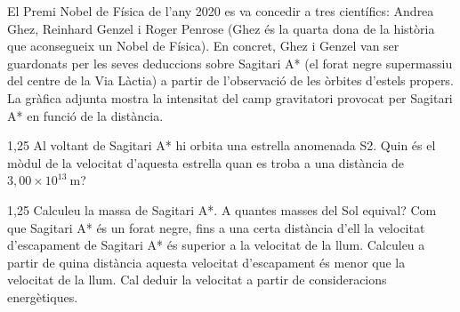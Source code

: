 El Premi Nobel de Física de l'any 2020 es va concedir a tres científics: Andrea Ghez, Reinhard Genzel i Roger Penrose (Ghez és la quarta dona de la història que aconsegueix un Nobel de Física). En concret, Ghez i Genzel van ser guardonats per les seves deduccions sobre Sagitari A* (el forat negre supermassiu del centre de la Via Làctia) a partir de l'observació de les òrbites d'estels propers. La gràfica adjunta mostra la intensitat del camp gravitatori provocat per Sagitari A* en funció de la distància.


\begin{apartat}{1,25}
Al voltant de Sagitari A* hi orbita una estrella anomenada S2. Quin és el mòdul de la velocitat d'aquesta estrella quan es troba a una distància de $3,00\times 10^{13}\ \mathrm{m}$?
\end{apartat}

\begin{apartat}{1,25}
Calculeu la massa de Sagitari A*. A quantes masses del Sol equival? Com que Sagitari A* és un forat negre, fins a una certa distància d'ell la velocitat d'escapament de Sagitari A* és superior a la velocitat de la llum. Calculeu a partir de quina distància aquesta velocitat d'escapament és menor que la velocitat de la llum. Cal deduir la velocitat a partir de consideracions energètiques.
\end{apartat}

